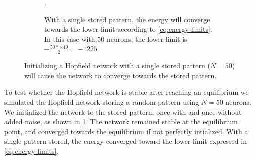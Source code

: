 \begin{figure}[H]
\begin{subfigure}{0.49\textwidth}
        \caption{With a single stored pattern, the energy will converge towards the lower limit according to \cref{eq:energy-limits}. In this case with 50 neurons, the lower limit is $-\frac{50*\times 49}{2} = -1225$}.
    \end{subfigure}
    \caption{Initializing a Hopfield network with a single stored pattern ($N = 50$) will cause the network to converge towards the stored pattern.}
    \label{fig:stable}
\end{figure}
To test whether the Hopfield network is stable after reaching an equilibrium we simulated the Hopfield network storing a random pattern using $N=50$ neurons. We initialized the network to the stored pattern, once with and once without added noise, as shown in \cref{fig:stable}. The network remained stable at the equilibrium point, and converged towards the equilibrium if not perfectly intialized. With a single pattern stored, the energy converged toward the lower limit expressed in \cref{eq:energy-limits}.

